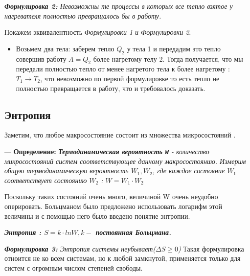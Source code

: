 \documentclass[12pt,a4paper]{report}
\begin{document}
\vspace{5px}

\textit{\textbf{Формулировка 2:} Невозможны те процессы в которых все тепло взятое у нагревателя полностью превращалось бы в работу.}

\vspace{5px}

Покажем эквивалентность\textit{ Формулировки 1 и Формулировки 2}.

\vspace{4px}
\begin{itemize}
    \item Возьмем два тела: заберем тепло $Q_2$ у тела 1 и передадим это тепло совершив работу $A = Q_2$ более нагретому телу 2. Тогда получается, что мы передали полностью тепло от менее нагретого тела к более нагретому : $T_1 \to T_2$, что невозможно по первой формулировке то есть тепло не полностью превращается в работу, что и требовалось доказать.
\end{itemize}
\subsection{Энтропия}
Заметим, что любое макросостояние состоит из множества микросостояний .

\vspace{4px}

--- \textbf{Определение:} \textit{\textbf{Термодинамическая вероятность \texttt{W}} - количество микросостояний систем соответствующее данному макросостоянию. Измерим общую термодинамическую вероятность $W_1, W_2$, где каждое состояние $W_1$ соответствует состоянию $W_2$ : $W = W_1 \cdot W_2$}

\vspace{4px}

Поскольку таких состояний очень много, величиной W очень неудобно оперировать. Больцманом было предложено использовать логарифм этой величины и с помощью него было введено понятие энтропии.

\vspace{5px}

\textit{\textbf{Энтропия : $S = k \cdot ln{W}, k - $ постоянная Больцмана.}}

\vspace{5px}

\textit{\textbf{Формулировка 3: }Энтропия системы неубывает($\Delta S \geq  0 $)}
Такая формулировка отноится не ко всем системам, но к любой замкнутой, применяется только для систем с огромным числом степеней свободы.
\end{document}
